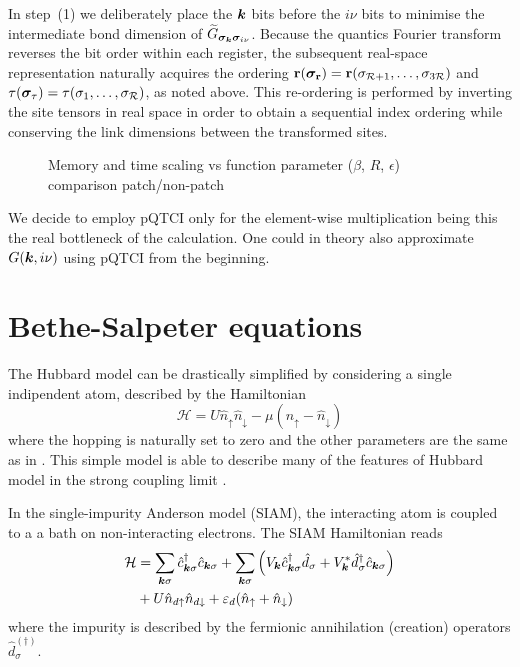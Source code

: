 In step~(1) we deliberately place the \(\boldsymbol{k}\) bits before the \(i\nu\) bits to minimise the intermediate bond dimension of
\(\widetilde G_{\boldsymbol{\sigma}_{\boldsymbol{k}}\boldsymbol{\sigma}_{i\nu}}\). Because the quantics Fourier transform reverses the bit order within each register, the subsequent real-space representation naturally acquires the ordering
\(\mathbf r(\boldsymbol{\sigma}_{\mathbf r})=\mathbf r(\sigma_{\mathcal R+1},\dots,
  \sigma_{3\mathcal R})\) and
\(\tau(\boldsymbol{\sigma}_{\tau})=\tau(\sigma_{1},\dots,\sigma_{\mathcal R})\),
as noted above. This re-ordering is performed by inverting the site tensors in real space in order to obtain a sequential index ordering while conserving the link dimensions between the transformed sites. 




\begin{figure}[ht!]
    \caption{Memory and time scaling vs function parameter ($\beta$, $R$, $\epsilon$) comparison patch/non-patch }
\end{figure}

We decide to employ pQTCI only for the element-wise multiplication being this the real bottleneck of the calculation. One could in theory also approximate $G(\boldsymbol{k},i\nu)$ using pQTCI from the beginning. 



\section{Bethe-Salpeter equations}
\label{sec:patchBSE}
The Hubbard model can be drastically simplified by considering a single indipendent atom, described by the Hamiltonian
\begin{equation}
    \mathcal{H} = U\hat{n}_{\uparrow}\hat{n}_{\downarrow} - \mu(\hat{n}_{\uparrow} - \hat{n}_{\downarrow})
\end{equation}
where the hopping is naturally set to zero and the other parameters are the same as in . This simple model is able to describe many of the features of Hubbard model in the strong coupling limit \cite{Thunstrom2018}. 

In the single-impurity Anderson model (SIAM), the interacting atom is coupled to a a bath on non-interacting electrons. The SIAM Hamiltonian reads \cite{Hewson1993}
\begin{equation}
    \begin{aligned}
    \mathcal{H} &= \sum_{\boldsymbol{k}\sigma}\hat{c}^\dag_{\boldsymbol{k}\sigma}\hat{c}_{\boldsymbol{k}\sigma} + \sum_{\boldsymbol{k}\sigma}\left( V_{\boldsymbol{k}}\hat{c}^\dag_{\boldsymbol{k}\sigma}\hat{d}_{\sigma} + V^*_{\boldsymbol{k}}\hat{d}^\dag_{\sigma}\hat{c}_{\boldsymbol{k}\sigma}\right) \\ &+ U\hat{n}_{d\uparrow}\hat{n}_{d\downarrow} + \varepsilon_d (\hat{n}_{\uparrow} + \hat{n}_{\downarrow})
        \end{aligned}
\end{equation}
where the impurity is described by the fermionic annihilation (creation) operators $\hat{d}^{(\dag)}_{\sigma}$. 


